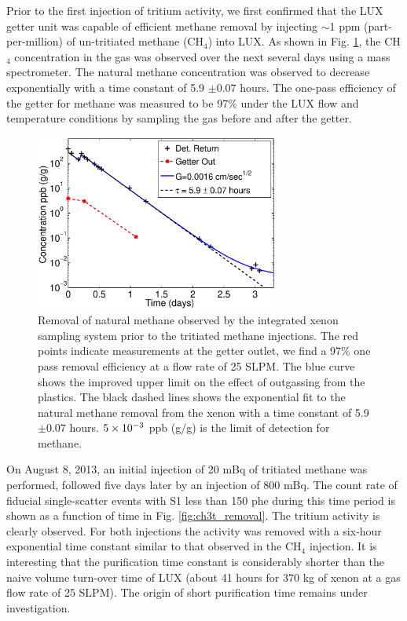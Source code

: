 Prior to the first injection of tritium activity, we first confirmed that the LUX getter unit was capable of efficient methane removal by injecting  $\sim$1 ppm (part-per-million) of un-tritiated methane (CH$_4$) into LUX. As shown in Fig. \ref{fig:ch4_removal}, the CH$_4$ concentration in the gas was observed over the next several days using a mass spectrometer. The natural methane concentration was observed to decrease exponentially with a time constant of 5.9 $\pm 0.07$ hours. The one-pass efficiency of the getter for methane was measured to be 97\% under the LUX flow and temperature conditions by sampling the gas before and after the getter. 

\begin{figure}[h!]\centering
\includegraphics[width=80mm]{July_CH4_wOG.eps}
\caption{Removal of natural methane observed by the integrated xenon sampling system prior to the tritiated methane injections. The red points indicate measurements at the getter outlet, we find a 97\% one pass removal efficiency at a flow rate of 25 SLPM. The blue curve shows the improved upper limit on the effect of outgassing from the plastics. The black dashed lines shows the exponential fit to the natural methane removal from the xenon with a time constant of 5.9 $\pm 0.07$ hours. $\rm 5\times10^{-3}$ ppb (g/g) is the limit of detection for methane.}
\label{fig:ch4_removal}
\end{figure}

On August 8, 2013, an initial injection of 20 mBq of tritiated methane was performed, followed five days later by an injection of 800 mBq.
The count rate of fiducial single-scatter events with S1 less than 150 phe during this time period is shown as a function of time in Fig. \ref{fig:ch3t_removal}. The tritium activity is clearly observed. For both injections the activity was removed with a six-hour exponential time constant similar to that observed in the CH$_4$ injection. It is interesting that the purification time constant is considerably shorter than the naive volume turn-over time of LUX (about 41 hours for 370 kg of xenon at a gas flow rate of 25 SLPM).  The origin of short purification time remains under investigation.

